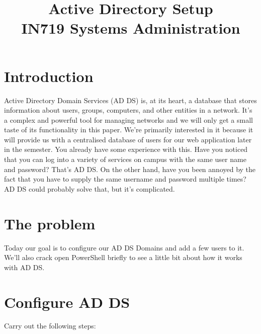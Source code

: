 \documentclass{article}
\begin{document}
\title{Active Directory Setup\\ IN719 Systems Administration}
\date{}
\maketitle

\section*{Introduction}
Active Directory Domain Services (AD DS) is, at its heart, a database that stores information about users, groups, computers, and other entities in a network. It's a complex and powerful tool for managing networks and we will only get a small taste of its functionality in this paper. We're primarily interested in it because it will provide us with a centralised database of users for our web application later in the semester. You already have some experience with this. Have you noticed that you can log into a variety of services on campus with the same user name and password? That's AD DS. On the other hand, have you been annoyed by the fact that you have to supply the same username and password multiple times? AD DS could probably solve that, but it's complicated.

\section{The problem}
Today our goal is to configure our AD DS Domains and add a few users to it. We'll also crack open PowerShell briefly to see a little bit about how it works with AD DS.

\section{Configure AD DS}
Carry out the following steps:
\end{document}
